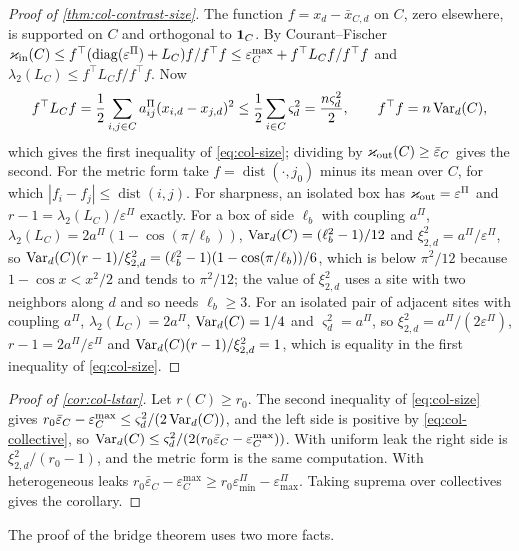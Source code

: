 \begin{proof}[Proof of \cref{thm:col-contrast-size}]
The function $f=x_d-\bar x_{C,d}$ on $C$, zero elsewhere, is supported on $C$ and orthogonal to $\mathbf{1}_C$. By Courant--Fischer $\varkappa_{\mathrm{in}}(C)\le f^\top(\operatorname{diag}(\varepsilon^\Pi)+L_C)f/f^\top f\le\varepsilon^{\max}_C+f^\top L_Cf/f^\top f$ and $\lambda_2(L_C)\le f^\top L_Cf/f^\top f$. Now
\[
f^\top L_Cf=\frac12\sum_{i,j\in C}a^\Pi_{ij}(x_{i,d}-x_{j,d})^2\le\frac12\sum_{i\in C}\varsigma_d^2=\frac{n\varsigma_d^2}{2},\qquad f^\top f=n\operatorname{Var}_d(C),
\]
which gives the first inequality of \eqref{eq:col-size}; dividing by $\varkappa_{\mathrm{out}}(C)\ge\bar\varepsilon_C$ gives the second. For the metric form take $f=\operatorname{dist}(\cdot,j_0)$ minus its mean over $C$, for which $|f_i-f_j|\le\operatorname{dist}(i,j)$. For sharpness, an isolated box has $\varkappa_{\mathrm{out}}=\varepsilon^\Pi$ and $r-1=\lambda_2(L_C)/\varepsilon^\Pi$ exactly. For a box of side $\ell_b$ with coupling $a^\Pi$, $\lambda_2(L_C)=2a^\Pi(1-\cos(\pi/\ell_b))$, $\operatorname{Var}_d(C)=(\ell_b^2-1)/12$ and $\xi_{2,d}^2=a^\Pi/\varepsilon^\Pi$, so $\operatorname{Var}_d(C)(r-1)/\xi_{2,d}^2=(\ell_b^2-1)(1-\cos(\pi/\ell_b))/6$, which is below $\pi^2/12$ because $1-\cos x<x^2/2$ and tends to $\pi^2/12$; the value of $\xi_{2,d}^2$ uses a site with two neighbors along $d$ and so needs $\ell_b\ge3$. For an isolated pair of adjacent sites with coupling $a^\Pi$, $\lambda_2(L_C)=2a^\Pi$, $\operatorname{Var}_d(C)=1/4$ and $\varsigma_d^2=a^\Pi$, so $\xi_{2,d}^2=a^\Pi/(2\varepsilon^\Pi)$, $r-1=2a^\Pi/\varepsilon^\Pi$ and $\operatorname{Var}_d(C)(r-1)/\xi_{2,d}^2=1$, which is equality in the first inequality of \eqref{eq:col-size}.
\end{proof}

\begin{proof}[Proof of \cref{cor:col-lstar}]
Let $r(C)\ge r_0$. The second inequality of \eqref{eq:col-size} gives $r_0\bar\varepsilon_C-\varepsilon^{\max}_C\le\varsigma_d^2/(2\operatorname{Var}_d(C))$, and the left side is positive by \eqref{eq:col-collective}, so $\operatorname{Var}_d(C)\le\varsigma_d^2/(2(r_0\bar\varepsilon_C-\varepsilon^{\max}_C))$. With uniform leak the right side is $\xi_{2,d}^2/(r_0-1)$, and the metric form is the same computation. With heterogeneous leaks $r_0\bar\varepsilon_C-\varepsilon^{\max}_C\ge r_0\varepsilon^\Pi_{\min}-\varepsilon^\Pi_{\max}$. Taking suprema over collectives gives the corollary.
\end{proof}

The proof of the bridge theorem uses two more facts.

